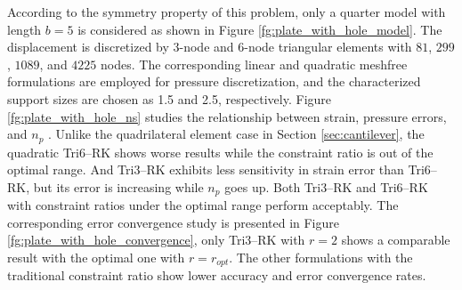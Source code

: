 According to the symmetry property of this problem, only a quarter model with length $b=5$ is considered as shown in Figure \ref{fg:plate_with_hole_model}. The displacement is discretized by 3-node and 6-node triangular elements with $81$, $299$, $1089$, and $4225$ nodes. The corresponding linear and quadratic meshfree formulations are employed for pressure discretization, and the characterized support sizes are chosen as 1.5 and 2.5, respectively.
Figure \ref{fg:plate_with_hole_ns} studies the relationship between strain, pressure errors, and $n_p$ \DIFaddbegin {}\DIFaddend .
Unlike the quadrilateral element case in Section \ref{sec:cantilever}, the quadratic Tri6--RK shows worse results while the constraint ratio is out of the optimal range. And Tri3--RK exhibits less sensitivity in strain error than Tri6--RK, but its error is increasing while $n_p$ goes up. Both Tri3--RK and Tri6--RK with constraint ratios under the optimal range perform acceptably. 
The corresponding error convergence study is presented in Figure \ref{fg:plate_with_hole_convergence},  \DIFaddbegin {}\DIFaddend only Tri3--RK with $r=2$ shows a comparable result with the optimal one with $r=r_{opt}$. The other formulations with the traditional constraint ratio show lower accuracy and error convergence rates.

